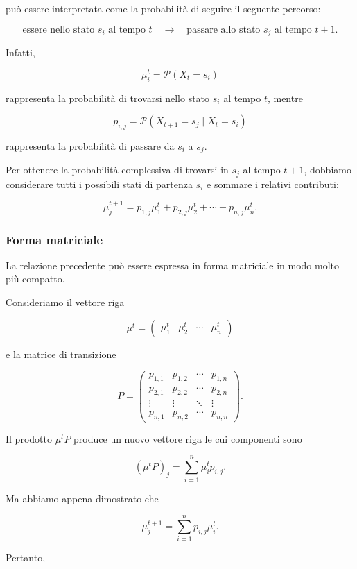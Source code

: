 può essere interpretata come la probabilità di seguire il seguente percorso:

\[
\text{essere nello stato }s_i\text{ al tempo }t
\quad\longrightarrow\quad
\text{passare allo stato }s_j\text{ al tempo }t+1.
\]

Infatti,

\[
\mu_i^t=\mathcal{P}(X_t=s_i)
\]

rappresenta la probabilità di trovarsi nello stato $s_i$ al tempo $t$, mentre

\[
p_{i,j}
=
\mathcal{P}(X_{t+1}=s_j\mid X_t=s_i)
\]

rappresenta la probabilità di passare da $s_i$ a $s_j$.

Per ottenere la probabilità complessiva di trovarsi in $s_j$ al tempo $t+1$, dobbiamo considerare tutti i possibili stati di partenza $s_i$ e sommare i relativi contributi:

\[
\mu_j^{t+1}
=
p_{1,j}\mu_1^t
+
p_{2,j}\mu_2^t
+\cdots+
p_{n,j}\mu_n^t.
\]

\subsubsection{Forma matriciale}

La relazione precedente può essere espressa in forma matriciale in modo molto più compatto.

Consideriamo il vettore riga

\[
\mu^t=
\begin{pmatrix}
\mu_1^t & \mu_2^t & \cdots & \mu_n^t
\end{pmatrix}
\]

e la matrice di transizione

\[
P=
\begin{pmatrix}
p_{1,1} & p_{1,2} & \cdots & p_{1,n}\\
p_{2,1} & p_{2,2} & \cdots & p_{2,n}\\
\vdots & \vdots & \ddots & \vdots\\
p_{n,1} & p_{n,2} & \cdots & p_{n,n}
\end{pmatrix}.
\]

Il prodotto $\mu^tP$ produce un nuovo vettore riga le cui componenti sono

\[
(\mu^tP)_j
=
\sum_{i=1}^{n}\mu_i^t p_{i,j}.
\]

Ma abbiamo appena dimostrato che

\[
\mu_j^{t+1}
=
\sum_{i=1}^{n}p_{i,j}\mu_i^t.
\]

Pertanto,

